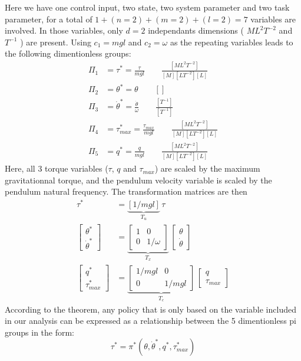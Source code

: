 Here we have one control input, two state, two system parameter and two task parameter, for a total of $1+(n=2)+(m=2)+(l=2)=7$ variables are involved. In those variables, only $d=2$ independants dimensions ( $ML^2T^{-2}$ and $T^{-1}$ ) are present. Using $c_1 = mgl$ and $c_2 = \omega$ as the repeating variables leads to the following dimentionless groups:
\begin{align}
\Pi_1 &= \tau^* = \frac{\tau}{mgl} \quad \quad \frac{[ML^2T^{-2}]}{[M][LT^{-2}][L]} \\
\Pi_2 &= \theta^* = \theta \quad \quad []\\
\Pi_3 &= \dot{\theta}^* = \frac{ \dot{\theta}  }{ \omega } \quad \quad \frac{[T^{-1}]}{[T^{-1}]} \\
\Pi_4 &= \tau_{max}^* = \frac{\tau_{max}}{mgl} \quad \quad \frac{[ML^2T^{-2}]}{[M][LT^{-2}][L]} \\
\Pi_5 &= q^* = \frac{q}{mgl} \quad \quad \frac{[ML^2T^{-2}]}{[M][LT^{-2}][L]} 
\end{align}
Here, all 3 torque variables ($\tau$, $q$ and $\tau_{max}$) are scaled by the maximum gravitationnal torque, and the pendulum velocity variable is scaled by the pendulum natural frequency. The transformation matrices are then
\begin{align}
\tau^* &= 
\underbrace{\left[  1/mgl \right]}_{T_u}
\, \tau  \label{eq:Tupendulum} \\
\begin{bmatrix}
\theta^* \\ \dot{\theta}^*
\end{bmatrix} &= 
\underbrace{
\begin{bmatrix}
    1 & 0 \\ 0 & 1/\omega
\end{bmatrix}
}_{T_x} \, 
\begin{bmatrix}
\theta \\ \dot{\theta}
\end{bmatrix}
 \label{eq:Txpendulum} \\
\begin{bmatrix}
q^* \\ \tau_{max}^*
\end{bmatrix} &= 
\underbrace{
\begin{bmatrix}
      1/mgl & 0 \\ 0 &  1/mgl
\end{bmatrix}
}_{T_c} \, 
\begin{bmatrix}
q \\ \tau_{max}
\end{bmatrix}
 \label{eq:Tcpendulum} 
\end{align}
According to the theorem, any policy that is only based on the variable included in our analysis can be expressed as a relationship between the 5 dimentionless pi groups in the form:
\begin{equation}
\tau^*
=
\pi^* \left(
\theta, \dot{\theta}^*,
q^* , \tau_{max}^* 
\right)
\end{equation}

